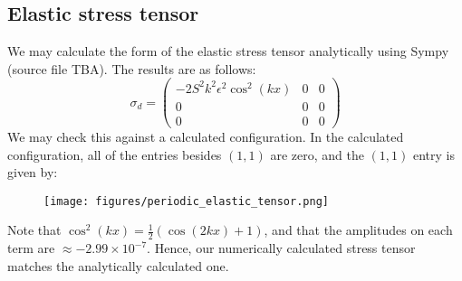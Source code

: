 \documentclass[reqno]{article}
\begin{document}
\subsection{Elastic stress tensor}
We may calculate the form of the elastic stress tensor analytically using Sympy
(source file TBA).
The results are as follows:
\begin{equation}
  \sigma_d
  =
  \begin{pmatrix}
    -2 S^2 k^2 \epsilon^2 \cos^2(kx) & 0 & 0 \\
    0 & 0 & 0 \\
    0 & 0 & 0
  \end{pmatrix}
\end{equation}
We may check this against a calculated configuration.
In the calculated configuration, all of the entries besides $(1, 1)$ are zero,
and the $(1, 1)$ entry is given by:
\begin{figure}[H]
  \centering
  \texttt{[image: figures/periodic\_elastic\_tensor.png]}
  \label{fig:periodic-elastic-tensor}
\end{figure}
Note that $\cos^2(kx) = \tfrac12 (\cos(2kx) + 1)$, and that the amplitudes on
each term are $\approx -2.99\times 10^{-7}$.
Hence, our numerically calculated stress tensor matches the analytically
calculated one.
\end{document}
